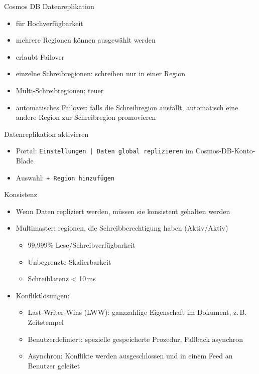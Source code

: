 \begin{flashcard}[Definition]{Cosmos DB Datenreplikation}
    \begin{itemize}
        \item für Hochverfügbarkeit
        \item mehrere Regionen können ausgewählt werden
        \item erlaubt Failover
        \item einzelne Schreibregionen: schreiben nur in einer Region
        \item Multi-Schreibregionen: teuer
        \item automatisches Failover: falls die Schreibregion ausfällt, automatisch eine andere Region zur Schreibregion promovieren
    \end{itemize}
\end{flashcard}

\begin{flashcard}[Definition]{Datenreplikation aktivieren}
    \begin{itemize}
        \item Portal: \texttt{Einstellungen | Daten global replizieren} im Cosmos-DB-Konto-Blade
        \item Auswahl: \texttt{+ Region hinzufügen}
    \end{itemize}
\end{flashcard}

\begin{flashcard}[Definition]{Konsistenz}
    \begin{itemize}
        \item Wenn Daten repliziert werden, müssen sie konsistent gehalten werden
        \item Multimaster: regionen, die Schreibberechtigung haben (Aktiv/Aktiv)
        \begin{itemize}
            \item 99,999\% Lese/Schreibverfügbarkeit
            \item Unbegrenzte Skalierbarkeit
            \item Schreiblatenz < 10\,ms
        \end{itemize}
        \item Konfliktlösungen:
        \begin{itemize}
            \item Last-Writer-Wins (LWW): ganzzahlige Eigenschaft im Dokument, z.\,B. Zeitstempel
            \item Benutzerdefiniert: spezielle gespeicherte Prozedur, Fallback asynchron
            \item Asynchron: Konflikte werden ausgeschlossen und in einem Feed an Benutzer geleitet
        \end{itemize}
    \end{itemize}
\end{flashcard}

